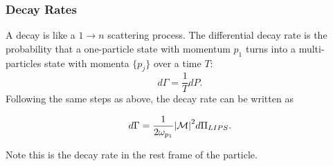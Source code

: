 \documentclass[11pt]{article}
\theoremstyle{definition}
\begin{document}
\subsubsection{Decay Rates}
A decay is like a $1 \rightarrow n$ scattering process. The differential decay rate is the probability  that a one-particle state with momentum $p_1$ turns into a multi-particles state with momenta $\{p_j\}$ over a time $T$:
\begin{equation}
    d\Gamma = \frac{1}{T}dP.
\end{equation}
Following the same steps as above, the decay rate can be written as 
\begin{shaded}
    \begin{equation}
        d\Gamma = \frac{1}{2\omega_{p_1}}\abs{\mathcal{M}}^2d\Pi_{LIPS}.
    \end{equation}
\end{shaded}
Note this is the decay rate in the rest frame of the particle.
\end{document}
